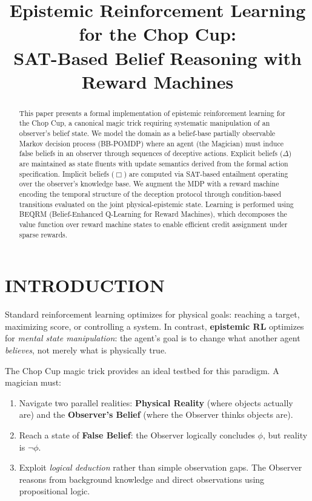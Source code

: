 \documentclass[letterpaper, 10 pt, conference]{ieeeconf}  %
\title{\LARGE \bf
Epistemic Reinforcement Learning for the Chop Cup:\\
SAT-Based Belief Reasoning with Reward Machines
}
\author{}
\begin{document}
\maketitle
\thispagestyle{empty}
\pagestyle{empty}


\begin{abstract}

This paper presents a formal implementation of epistemic reinforcement learning for the Chop Cup, a canonical magic trick requiring systematic manipulation of an observer's belief state. We model the domain as a belief-base partially observable Markov decision process (BB-POMDP) where an agent (the Magician) must induce false beliefs in an observer through sequences of deceptive actions. Explicit beliefs ($\Delta$) are maintained as state fluents with update semantics derived from the formal action specification. Implicit beliefs ($\Box$) are computed via SAT-based entailment operating over the observer's knowledge base. We augment the MDP with a reward machine encoding the temporal structure of the deception protocol through condition-based transitions evaluated on the joint physical-epistemic state. Learning is performed using BEQRM (Belief-Enhanced Q-Learning for Reward Machines), which decomposes the value function over reward machine states to enable efficient credit assignment under sparse rewards.

\end{abstract}


\section{INTRODUCTION}

Standard reinforcement learning optimizes for physical goals: reaching a target, maximizing score, or controlling a system. In contrast, \textbf{epistemic RL} optimizes for \emph{mental state manipulation}: the agent's goal is to change what another agent \emph{believes}, not merely what is physically true.

The Chop Cup magic trick provides an ideal testbed for this paradigm. A magician must:
\begin{enumerate}
    \item Navigate two parallel realities: \textbf{Physical Reality} (where objects actually are) and the \textbf{Observer's Belief} (where the Observer thinks objects are).
    \item Reach a state of \textbf{False Belief}: the Observer logically concludes $\phi$, but reality is $\neg\phi$.
    \item Exploit \emph{logical deduction} rather than simple observation gaps. The Observer reasons from background knowledge and direct observations using propositional logic.
\end{enumerate}
\end{document}

